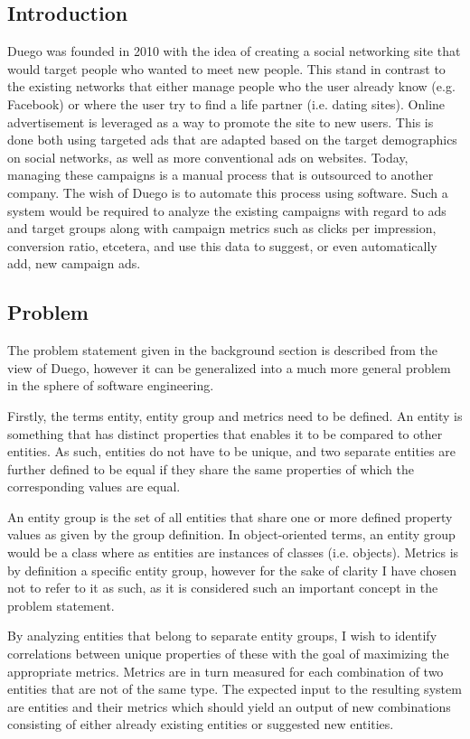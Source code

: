 \documentclass[a4paper]{article}
\begin{document}
\subsection{Introduction}
Duego was founded in 2010 with the idea of creating a social networking site that would target people who wanted to meet new
people. This stand in contrast to the existing networks that either manage people who the user already know (e.g. Facebook)
or where the user try to find a life partner (i.e. dating sites). Online advertisement is leveraged as a way to promote the
site to new users. This is done both using targeted ads that are adapted based on the target demographics on social networks,
as well as more conventional ads on websites. Today, managing these campaigns is a manual process that is outsourced to
another company. The wish of Duego is to automate this process using software. Such a system would be required to analyze
the existing campaigns with regard to ads and target groups along with campaign metrics such as clicks per impression,
conversion ratio, etcetera, and use this data to suggest, or even automatically add, new campaign ads.

\subsection{Problem}
The problem statement given in the background section is described from the view of Duego, however it can be generalized into
a much more general problem in the sphere of software engineering.

Firstly, the terms entity, entity group and metrics need to be defined. An entity is something that has distinct properties
that enables it to be compared to other entities. As such, entities do not have to be unique, and two separate entities are
further defined to be equal if they share the same properties of which the corresponding values are equal.

An entity group is the set of all entities that share one or more defined property values as given by the group definition.
In object-oriented terms, an entity group would be a class where as entities are instances of classes (i.e. objects). Metrics
is by definition a specific entity group, however for the sake of clarity I have chosen not to refer to it as such, as it is
considered such an important concept in the problem statement.

By analyzing entities that belong to separate entity groups, I wish to identify correlations between unique properties of
these with the goal of maximizing the appropriate metrics. Metrics are in turn measured for each combination of two entities
that are not of the same type. The expected input to the resulting system are entities and their metrics which should yield
an output of new combinations consisting of either already existing entities or suggested new entities.
\end{document}
